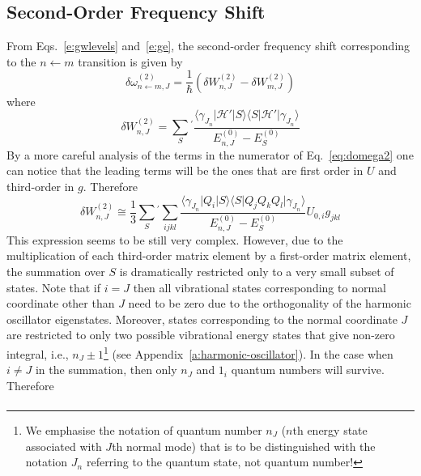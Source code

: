 \documentclass[b5paper,oneside,fleqn,11pt]{book}
\begin{document}
\begin{refsection}
\subsection{Second-Order Frequency Shift}

From Eqs.~\eqref{e:gwlevels} and~\eqref{e:ge}, the second\hyp{}order 
frequency shift corresponding to the $n\leftarrow m$ transition 
is given by
%
\begin{equation}\label{e:dw-second-order-pt}
\delta \omega_{n\leftarrow m,J}^{(2)} = 
\frac{1}{\hbar} 
\left( \delta W_{n,J}^{(2)} - \delta W_{m,J}^{(2)} \right)
\end{equation}
%
where
%
\begin{equation}\label{eq:domega2}
\delta W_{n,J}^{(2)} = \sum_{S}{^{'}}
\frac{
   \langle \gamma_{J_n} \vert \mathscr{H}' \vert S            \rangle
   \langle S            \vert \mathscr{H}' \vert \gamma_{J_n} \rangle
}{E^{(0)}_{n,J} - E^{(0)}_S}
\end{equation}
%
By a more careful analysis of the terms in the numerator of
Eq.~\eqref{eq:domega2} one can notice that the leading terms
will be the ones that are first order in $U$ and third-order 
in $g$. Therefore 
%
\begin{equation}\label{eq:domega2approx}
\delta W_{n,J}^{(2)} \cong 
\frac{1}{3}
\sum_{S}{^{'}}
\sum_{ijkl}
\frac{
   \langle \gamma_{J_n} \vert Q_i \vert S                   \rangle
   \langle S            \vert Q_jQ_kQ_l \vert \gamma_{J_n}  \rangle
}{E^{(0)}_{n,J} - E^{(0)}_S} U_{0,i} g_{jkl}
\end{equation}
%
This expression seems to be still very complex. However, due to the multiplication of each 
third-order matrix element by a first-order matrix element, the summation
over $S$ is dramatically restricted only to a very small subset of states.
Note that if $i=J$ then all vibrational states corresponding to normal coordinate
other than $J$ need to be zero due to the orthogonality of the harmonic oscillator
eigenstates. Moreover, states corresponding to the normal coordinate $J$ are restricted 
to only two possible
vibrational energy states that give non\hyp{}zero integral, i.e., $n_J \pm 1$\footnote{
We emphasise the notation of quantum number $n_J$ ($n$th energy state associated with 
$J$th normal mode) that is to be distinguished with
the notation $J_n$ referring to the quantum state, not quantum number!} 
(see Appendix~\ref{a:harmonic-oscillator}).
In the case when $i\ne J$ in the summation, then only $n_J$ and $1_i$ quantum numbers will 
survive. Therefore
%
\begin{multline}  \label{eq:1x3}

\end{multline}
\end{refsection}
\end{document}
